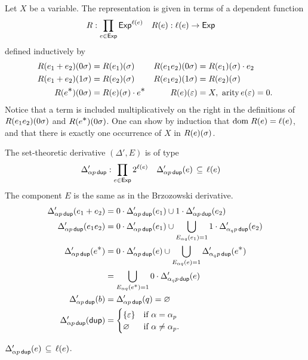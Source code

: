 \documentclass{article}
\newcommand\pdup{\mathop{\mathsf{dup}}}
\newcommand\Exp{\mathsf{Exp}}
\renewcommand\star{^{\textstyle *}}
\begin{document}
Let $X$ be a variable. The representation is given in terms of a dependent function
\begin{align*}
\repname &: \prod_{e\in\Exp}\Exp^{\ell(e)} & \repone e &: \ell(e)\to\Exp
\end{align*}
defined inductively by
\begin{align*}
\rep{0\sigma}{e_1+e_2} &= \rep\sigma{e_1} & \rep{0\sigma}{e_1e_2} &= \rep\sigma{e_1}\cdot e_2\\
\rep{1\sigma}{e_1+e_2} &= \rep\sigma{e_2} & \rep{1\sigma}{e_1e_2} &= \rep\sigma{e_2}\\
\rep{0\sigma}{e\star} &= \rep\sigma e\cdot e\star & \rep\eps e &= X,\ \text{$\arity{e(\eps)}=0$.}
\end{align*}
Notice that a term is included multiplicatively on the right in the definitions of $\rep{0\sigma}{e_1e_2}$ and $\rep{0\sigma}{e\star}$.
One can show by induction that $\dom{\repone e}=\ell(e)$, and that there is exactly one occurrence of $X$ in $\rep\sigma e$.

The set-theoretic derivative $(\Delta',E)$ is of type
\begin{align*}
\Delta'_{\alpha p\pdup} &: \prod_{e\in\Exp}2^{\ell(e)} & \Delta'_{\alpha p\pdup}(e) &\subs \ell(e)
\end{align*}
The component $E$ is the same as in the Brzozowski derivative.
\begin{align*}
\Delta'_{\alpha p\pdup}(e_1+e_2) &= 0\cdot\Delta'_{\alpha p\pdup}(e_1) \cup 1\cdot\Delta'_{\alpha p\pdup}(e_2)\\
\Delta'_{\alpha p\pdup}(e_1e_2) &= 0\cdot\Delta'_{\alpha p\pdup}(e_1) \cup \bigcup_{E_{\alpha q}(e_1)=1} 1\cdot\Delta'_{\alpha_qp\pdup}(e_2)\\
\Delta'_{\alpha p\pdup}(e\star) &= 0\cdot\Delta'_{\alpha p\pdup}(e) \cup \bigcup_{E_{\alpha q}(e)=1}\Delta'_{\alpha_qp\pdup}(e\star)\\
&= \bigcup_{E_{\alpha q}(e^{\scriptstyle *})=1} 0\cdot\Delta'_{\alpha_qp\pdup}(e)\\
\Delta'_{\alpha p\pdup}(b) &= \Delta'_{\alpha p\pdup}(q) = \emptyset\\
\Delta'_{\alpha p\pdup}(\pdup) &= \begin{cases}
\{\eps\} & \text{if $\alpha=\alpha_p$}\\
\emptyset & \text{if $\alpha\neq\alpha_p$.}
\end{cases}
\end{align*}

\begin{lemma}
\label{eq:Deltacl}
$\Delta'_{\alpha p\pdup}(e) \subs \ell(e)$.
\end{lemma}
\end{document}
